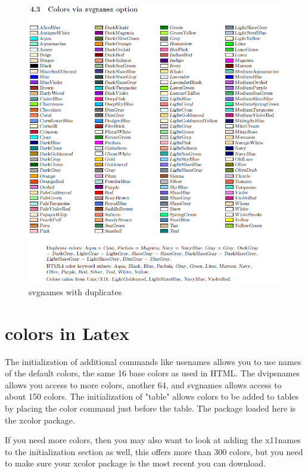 \documentclass[11pt,a4paper,english]{article}
\begin{document}
\begin{figure}[ht!]
\centering
\includegraphics[scale=0.9]{images/svgnames_with_duplicates.png}
\caption{svgnames with duplicates}
\label{fig:svgnames_with_duplicates}   
\end{figure}
\clearpage


\section{colors in Latex}
The initialization of additional commands like usenames allows you to use 
names of the default colors, the same 16 base colors as used in HTML. 
The dvipsnames allows you access to more colors, another 64, and svgnames 
allows access to about 150 colors. The initialization of "table" allows 
colors to be added to tables by placing the color command just before the table. 
The package loaded here is the xcolor package.

If you need more colors, then you may also want to look at adding the x11names 
to the initialization section as well, this offers more than 300 colors, 
but you need to make sure your xcolor package is the most recent you can download.
\end{document}
